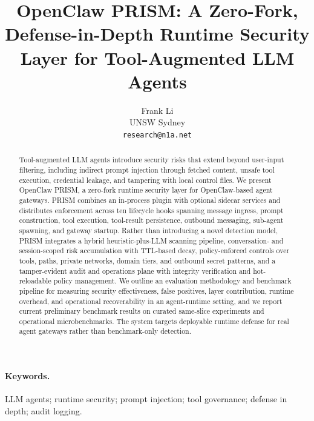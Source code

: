 \documentclass[11pt]{article}
\title{OpenClaw PRISM: A Zero-Fork, Defense-in-Depth Runtime Security Layer for Tool-Augmented LLM Agents}
\author{Frank Li\\UNSW Sydney\\\texttt{research@n1a.net}}
\date{}
\begin{document}
\maketitle

\begin{abstract}
Tool-augmented LLM agents introduce security risks that extend beyond user-input filtering, including indirect prompt injection through fetched content, unsafe tool execution, credential leakage, and tampering with local control files. We present OpenClaw PRISM, a zero-fork runtime security layer for OpenClaw-based agent gateways. PRISM combines an in-process plugin with optional sidecar services and distributes enforcement across ten lifecycle hooks spanning message ingress, prompt construction, tool execution, tool-result persistence, outbound messaging, sub-agent spawning, and gateway startup. Rather than introducing a novel detection model, PRISM integrates a hybrid heuristic-plus-LLM scanning pipeline, conversation- and session-scoped risk accumulation with TTL-based decay, policy-enforced controls over tools, paths, private networks, domain tiers, and outbound secret patterns, and a tamper-evident audit and operations plane with integrity verification and hot-reloadable policy management. We outline an evaluation methodology and benchmark pipeline for measuring security effectiveness, false positives, layer contribution, runtime overhead, and operational recoverability in an agent-runtime setting, and we report current preliminary benchmark results on curated same-slice experiments and operational microbenchmarks. The system targets deployable runtime defense for real agent gateways rather than benchmark-only detection.
\end{abstract}

\paragraph{Keywords.}
LLM agents; runtime security; prompt injection; tool governance; defense in depth; audit logging.












\end{document}
